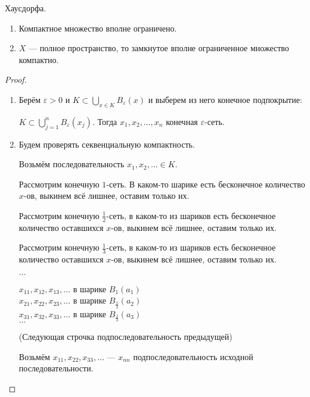 \begin{theorem-non}
    Хаусдорфа.

    \begin{enumerate}
        \item Компактное множество вполне ограничено.
        \item $X$ --- полное пространство, то замкнутое вполне ограниченное множество компактно.
    \end{enumerate}

    \begin{proof}
        \begin{enumerate}
            \item Берём $\varepsilon > 0$  и $K \subset \bigcup_{x \in K}B_{\varepsilon}(x)$ и выберем из него конечное подпокрытие:
            
            $K \subset \bigcup_{j = 1}^n B_{\varepsilon}(x_j)$. Тогда $x_1, x_2, \dots, x_n$ конечная $\varepsilon$-сеть.

            \item 
            Будем проверять секвенциальную компактность.
            
            Возьмём последовательность $x_1, x_2, \dots \in K$.

            Рассмотрим конечную $1$-сеть.
            В каком-то шарике есть бесконечное количество $x$-ов, выкинем всё лишнее, оставим только их.
            
            Рассмотрим конечную $\frac{1}{2}$-сеть, в каком-то из шариков есть бесконечное количество оставшихся $x$-ов, выкинем всё лишнее, оставим только их.

            Рассмотрим конечную $\frac{1}{3}$-сеть, в каком-то из шариков есть бесконечное количество оставшихся $x$-ов, выкинем всё лишнее, оставим только их.

            $\dots$

            $x_{11}, x_{12}, x_{13}, \dots $ в шарике $B_1(a_1)$ \\
            $x_{21}, x_{22}, x_{23}, \dots $ в шарике $B_{\frac{1}{2}}(a_2)$ \\
            $x_{31}, x_{32}, x_{33}, \dots $ в шарике $B_{\frac{1}{3}}(a_3)$  \\
            $\dots$

            (Следующая строчка подпоследовательность предыдущей)

            Возьмём $x_{11}, x_{22}, x_{33}, \dots$ --- $x_{nn}$ подпоследовательность исходной последовательности.


\end{enumerate}
\end{proof}
\end{theorem-non}
